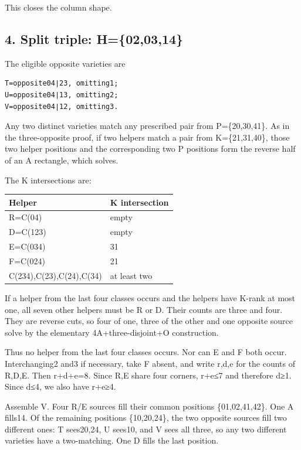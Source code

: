 \documentclass[
  10pt,
]{article}
\begin{document}
This closes the column shape.

\hypertarget{split-triple-h020314}{%
\subsection*{4. Split triple:
H=\{02,03,14\}}\label{split-triple-h020314}}

The eligible opposite varieties are

\begin{verbatim}
T=opposite04∣23, omitting1;
U=opposite04∣13, omitting2;
V=opposite04∣12, omitting3.
\end{verbatim}

Any two distinct varieties match any prescribed pair from
P=\{20,30,41\}. As in the three-opposite proof, if two helpers match a
pair from K=\{21,31,40\}, those two helper positions and the
corresponding two P positions form the reverse half of an A rectangle,
which solves.

The K intersections are:

\begin{longtable}[]{@{}ll@{}}
\toprule\noalign{}
Helper & K intersection \\
\midrule\noalign{}
\endhead
\bottomrule\noalign{}
\endlastfoot
R=C(04) & empty \\
D=C(123) & empty \\
E=C(034) & 31 \\
F=C(024) & 21 \\
C(234),C(23),C(24),C(34) & at least two \\
\end{longtable}

If a helper from the last four classes occurs and the helpers have
K-rank at most one, all seven other helpers must be R or D. Their counts
are three and four. They are reverse cuts, so four of one, three of the
other and one opposite source solve by the elementary
4A+three-disjoint+O construction.

Thus no helper from the last four classes occurs. Nor can E and F both
occur. Interchanging2 and3 if necessary, take F absent, and write r,d,e
for the counts of R,D,E. Then r+d+e=8. Since R,E share four corners,
r+e≤7 and therefore d≥1. Since d≤4, we also have r+e≥4.

Assemble V. Four R/E sources fill their common positions
\{01,02,41,42\}. One A fills14. Of the remaining positions \{10,20,24\},
the two opposite sources fill two different ones: T sees20,24, U sees10,
and V sees all three, so any two different varieties have a
two-matching. One D fills the last position.
\end{document}

